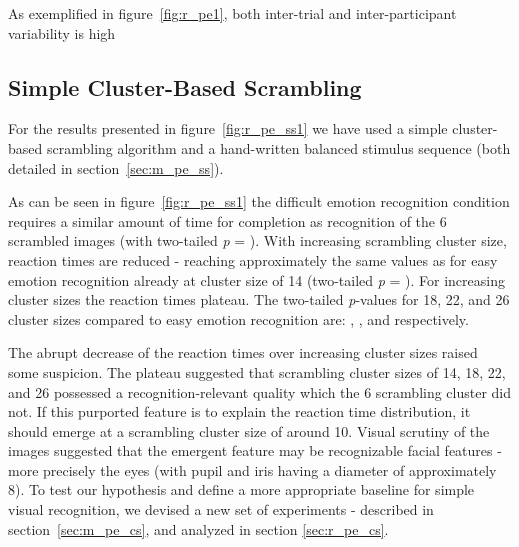 	
	As exemplified in figure~\ref{fig:r_pe1}, both inter-trial and inter-participant variability is high
	\subsection{Simple Cluster-Based Scrambling}\label{sec:r_pe_ss}
	    For the results presented in figure~\ref{fig:r_pe_ss1} we have used a simple cluster-based scrambling algorithm and a hand-written balanced stimulus sequence 
	    (both detailed in section~\ref{sec:m_pe_ss}).
	    
	    As can be seen in figure~\ref{fig:r_pe_ss1} the difficult emotion recognition condition requires a similar amount of time for completion as recognition of the \SI{6}{\pixel} scrambled images 
	    (with two-tailed \textit{p} = ).
	    With increasing scrambling cluster size, reaction times are reduced - reaching approximately the same values as for easy emotion recognition already at cluster size of \SI{14}{\pixel}
	    (two-tailed \textit{p} = ).
	    For increasing cluster sizes the reaction times plateau. 
	    The two-tailed \textit{p}-values for \SI{18}{\pixel}, \SI{22}{\pixel}, and \SI{26}{\pixel} cluster sizes compared to easy emotion recognition are:
	    , , and  respectively.
	    
	    The abrupt decrease of the reaction times over increasing cluster sizes raised some suspicion.
	    The plateau suggested that scrambling cluster sizes of \SI{14}{\pixel}, \SI{18}{\pixel}, \SI{22}{\pixel}, and \SI{26}{\pixel} possessed a recognition-relevant quality which the \SI{6}{\pixel} scrambling cluster did not.
	    If this purported feature is to explain the reaction time distribution, it should emerge at a scrambling cluster size of around \SI{10}{\pixel}.
	    Visual scrutiny of the images suggested that the emergent feature may be recognizable facial features - more precisely the eyes (with pupil and iris having a diameter of approximately \SI{8}{\pixel}).
	    To test our hypothesis and define a more appropriate baseline for simple visual recognition, we devised a new set of experiments - described in section~\ref{sec:m_pe_cs}, and analyzed in section \ref{sec:r_pe_cs}.
	    
